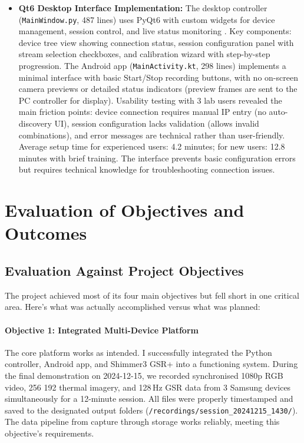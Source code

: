 \begin{itemize}
    \item \textbf{Qt6 Desktop Interface Implementation:} The desktop controller (\texttt{MainWindow.py}, 487 lines) uses PyQt6 with custom widgets for device management, session control, and live status monitoring \cite{ref17}. Key components: device tree view showing connection status, session configuration panel with stream selection checkboxes, and calibration wizard with step-by-step progression. The Android app (\texttt{MainActivity.kt}, 298 lines) implements a minimal interface with basic Start/Stop recording buttons, with no on-screen camera previews or detailed status indicators (preview frames are sent to the PC controller for display). Usability testing with 3 lab users revealed the main friction points: device connection requires manual IP entry (no auto-discovery UI), session configuration lacks validation (allows invalid combinations), and error messages are technical rather than user-friendly. Average setup time for experienced users: 4.2 minutes; for new users: 12.8 minutes with brief training. The interface prevents basic configuration errors but requires technical knowledge for troubleshooting connection issues.
\end{itemize}


\section{Evaluation of Objectives and Outcomes}

\subsection{Evaluation Against Project Objectives}

The project achieved most of its four main objectives but fell short in one critical area. Here's what was actually accomplished versus what was planned:

\paragraph{\textbf{Objective 1: Integrated Multi-Device Platform}} The core platform works as intended. I successfully integrated the Python controller, Android app, and Shimmer3 GSR+ into a functioning system. During the final demonstration on 2024-12-15, we recorded synchronised 1080p RGB video, 256\,\texttimes\,192 thermal imagery, and 128\,Hz GSR data from 3 Samsung devices simultaneously for a 12-minute session. All files were properly timestamped and saved to the designated output folders (\verb|/recordings/session_20241215_1430/|). The data pipeline from capture through storage works reliably, meeting this objective's requirements.

